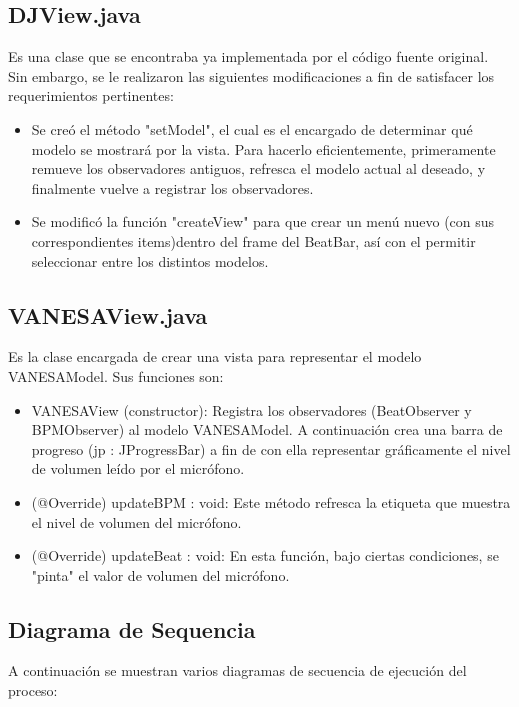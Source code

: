 \documentclass[10pt]{article} %
\begin{document}
\subsection{DJView.java}
Es una clase que se encontraba ya implementada por el código fuente original. Sin embargo, se le realizaron las siguientes modificaciones a fin de satisfacer los requerimientos pertinentes:
\begin{itemize}
\item Se creó el método "setModel", el cual es el encargado de determinar qué modelo se mostrará por la vista. Para hacerlo eficientemente, primeramente remueve los observadores antiguos, refresca el modelo actual al deseado, y finalmente vuelve a registrar los observadores.
\item Se modificó la función "createView" para que crear un menú nuevo (con sus correspondientes items)dentro del frame del BeatBar, así con el permitir seleccionar entre los distintos modelos.
\end{itemize}

\subsection{VANESAView.java}
Es la clase encargada de crear una vista para representar el modelo VANESAModel. Sus funciones son:
\begin{itemize}
\item VANESAView (constructor): Registra los observadores (BeatObserver y BPMObserver) al modelo VANESAModel. A continuación crea una barra de progreso (jp : JProgressBar) a fin de con ella representar gráficamente el nivel de volumen leído por el micrófono.
\item (@Override) updateBPM : void: Este método refresca la etiqueta que muestra el nivel de volumen del micrófono.
\item (@Override) updateBeat : void: En esta función, bajo ciertas condiciones, se "pinta" el valor de volumen del micrófono. 
\end{itemize}

\subsection{Diagrama de Sequencia}
A continuación se muestran varios diagramas de secuencia de ejecución del proceso:
\end{document}
